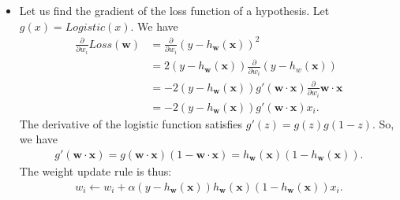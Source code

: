 \documentclass[10pt]{article}
\begin{document}
\begin{itemize}
    \item Let us find the gradient of the loss function
        of a hypothesis. Let $g(x) = Logistic(x)$. We have
        \begin{align*}
            \frac{\partial}{\partial w_i} Loss(\mathbf{w})
            &= \frac{\partial}{\partial w_i}
            (y - h_\mathbf{w}(\mathbf{x}))^2\\
            &= 2(y-h_\mathbf{w}(\mathbf{x}))
            \frac{\partial}{\partial w_i}(y - h_w(\mathbf{x}))\\
            &= -2(y-h_\mathbf{w}(\mathbf{x})) 
                g'(\mathbf{w}\cdot\mathbf{x})
                \frac{\partial}{\partial w_i} 
                \mathbf{w}\cdot\mathbf{x}\\
            &= -2 (y-h_\mathbf{w}(\mathbf{x})) 
                g'(\mathbf{w}\cdot\mathbf{x})
                x_i.
        \end{align*}
        The derivative of the logistic function satisfies
        $g'(z) = g(z)g(1-z)$. So, we have
        \begin{align*}
            g'(\mathbf{w} \cdot \mathbf{x})
            = g(\mathbf{w} \cdot \mathbf{x})(1-\mathbf{w} \cdot \mathbf{x})
            = h_{\mathbf{w}}(\mathbf{x})
                (1 - h_{\mathbf{w}}(\mathbf{x})).
        \end{align*}
        The weight update rule is thus:
        \begin{align*}
            w_i \gets w_i + \alpha (y-h_\mathbf{w}(\mathbf{x}))
                h_{\mathbf{w}}(\mathbf{x})
                (1 - h_{\mathbf{w}}(\mathbf{x}))
                x_i.
        \end{align*}
\end{itemize} 
\end{document}

